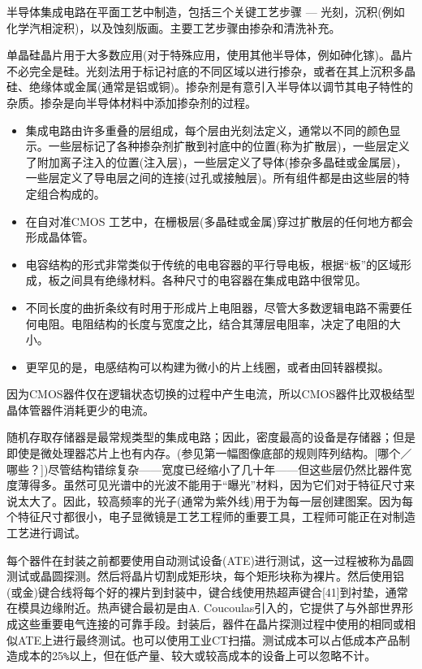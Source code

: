 半导体集成电路在平面工艺中制造，包括三个关键工艺步骤 — 光刻，沉积(例如化学汽相淀积)，以及蚀刻版画。主要工艺步骤由掺杂和清洗补充。

单晶硅晶片用于大多数应用(对于特殊应用，使用其他半导体，例如砷化镓)。晶片不必完全是硅。光刻法用于标记衬底的不同区域以进行掺杂，或者在其上沉积多晶硅、绝缘体或金属(通常是铝或铜)。掺杂剂是有意引入半导体以调节其电子特性的杂质。掺杂是向半导体材料中添加掺杂剂的过程。

\begin{itemize}
\item 集成电路由许多重叠的层组成，每个层由光刻法定义，通常以不同的颜色显示。一些层标记了各种掺杂剂扩散到衬底中的位置(称为扩散层)，一些层定义了附加离子注入的位置(注入层)，一些层定义了导体(掺杂多晶硅或金属层)，一些层定义了导电层之间的连接(过孔或接触层)。所有组件都是由这些层的特定组合构成的。
\item 在自对准CMOS 工艺中，在栅极层(多晶硅或金属)穿过扩散层的任何地方都会形成晶体管。
\item 电容结构的形式非常类似于传统的电电容器的平行导电板，根据“板”的区域形成，板之间具有绝缘材料。各种尺寸的电容器在集成电路中很常见。
\item 不同长度的曲折条纹有时用于形成片上电阻器，尽管大多数逻辑电路不需要任何电阻。电阻结构的长度与宽度之比，结合其薄层电阻率，决定了电阻的大小。
\item 更罕见的是，电感结构可以构建为微小的片上线圈，或者由回转器模拟。
\end{itemize}

因为CMOS器件仅在逻辑状态切换的过程中产生电流，所以CMOS器件比双极结型晶体管器件消耗更少的电流。

随机存取存储器是最常规类型的集成电路；因此，密度最高的设备是存储器；但是即使是微处理器芯片上也有内存。(参见第一幅图像底部的规则阵列结构。[哪个／哪些？])尽管结构错综复杂——宽度已经缩小了几十年——但这些层仍然比器件宽度薄得多。虽然可见光谱中的光波不能用于“曝光”材料，因为它们对于特征尺寸来说太大了。因此，较高频率的光子(通常为紫外线)用于为每一层创建图案。因为每个特征尺寸都很小，电子显微镜是工艺工程师的重要工具，工程师可能正在对制造工艺进行调试。

每个器件在封装之前都要使用自动测试设备(ATE)进行测试，这一过程被称为晶圆测试或晶圆探测。然后将晶片切割成矩形块，每个矩形块称为裸片。然后使用铝(或金)键合线将每个好的裸片到封装中，键合线使用热超声键合[41]到衬垫，通常在模具边缘附近。热声键合最初是由A. Coucoulas引入的，它提供了与外部世界形成这些重要电气连接的可靠手段。封装后，器件在晶片探测过程中使用的相同或相似ATE上进行最终测试。也可以使用工业CT扫描。测试成本可以占低成本产品制造成本的25\verb|%|以上，但在低产量、较大或较高成本的设备上可以忽略不计。

